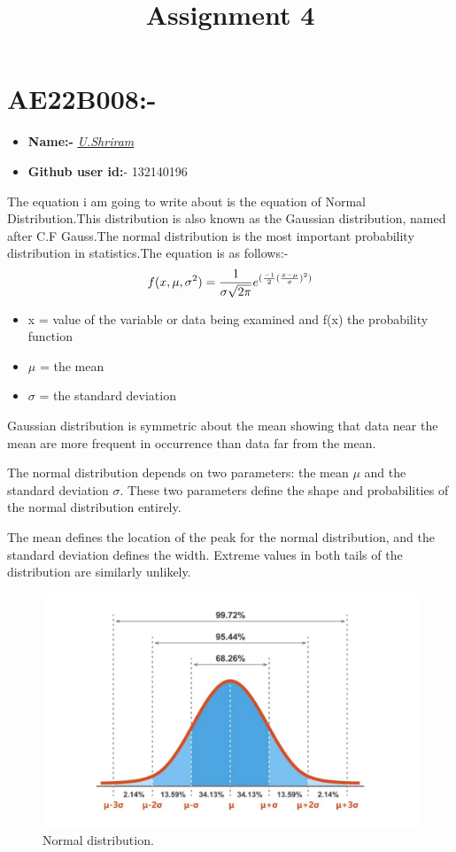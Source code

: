 \documentclass[12pt]{article}
\title{Assignment 4}
\date{}
\author{}
\begin{document}
\maketitle

\section{AE22B008:- }
\begin{itemize}
    \item \textbf{Name:- } \underline{\textit{U.Shriram}}
    \item \textbf{Github user id:}- 132140196
\end{itemize}
    The equation i am going to write about is the equation of Normal Distribution.This distribution is also known as the Gaussian distribution, named after C.F Gauss.The normal distribution is the most important probability distribution in statistics.The equation is as follows:- 
\bigskip    
\begin{equation}
    \Large f(x,\mu,\sigma^2)=\frac{1}{\sigma\sqrt{2\pi}}e^{(\frac{-1}{2}(\frac{x-\mu}{\sigma})^2)} 
\end{equation}
\begin{itemize}
    \item x = value of the variable or data being examined and f(x) the probability function
    \item $\mu$ = the mean
    \item $\sigma$ = the standard deviation
\end{itemize}

\bigskip
Gaussian distribution is symmetric about the mean showing that data near the mean are more frequent in occurrence than data far from the mean.

\medskip
The normal distribution depends on two parameters: the mean $\mu$ and the standard deviation $\sigma$. These two parameters define the shape and probabilities of the normal distribution entirely. 

\medskip
The mean defines the location of the peak for the normal distribution, and the standard deviation defines the width. Extreme values in both tails of the distribution are similarly unlikely.

\begin{figure}[ht]
    \centering
    \includegraphics[width=1\textwidth]{bell_curve.jpg}
    \caption{Normal distribution.}
    \label{fig:mesh1}
\end{figure}
\end{document}
